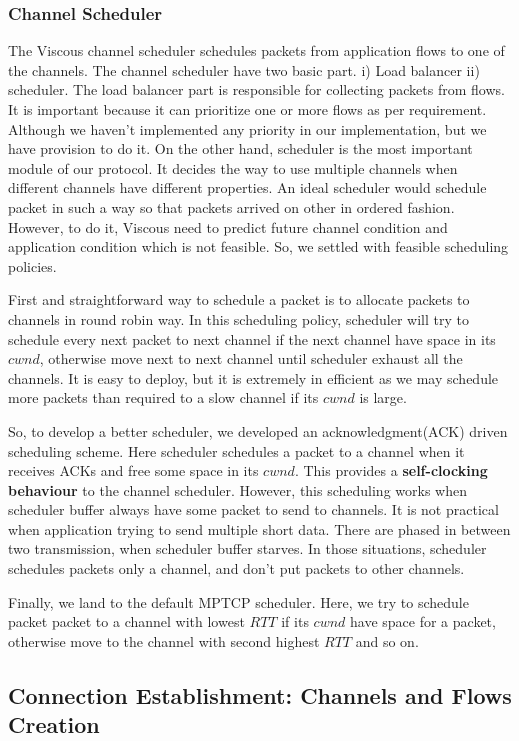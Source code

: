 \subsubsection{Channel Scheduler}
The Viscous channel scheduler schedules packets from application flows to one of the channels. The channel scheduler have two basic part. i) Load balancer ii) scheduler. The load balancer part is responsible for collecting packets from flows. It is important because it can prioritize one or more flows as per requirement. Although we haven't implemented any priority in our implementation, but we have provision to do it. On the other hand, scheduler is the most important module of our protocol. It decides the way to use multiple channels when different channels have different properties. An ideal scheduler would schedule packet in such a way so that packets arrived on other in ordered fashion. However, to do it, Viscous need to predict future channel condition and application condition which is not feasible. So, we settled with feasible scheduling policies.

First and straightforward way to schedule a packet is to allocate packets to channels in round robin way. In this scheduling policy, scheduler will try to schedule every next packet to next channel if the next channel have space in its $cwnd$, otherwise move next to next channel until scheduler exhaust all the channels. It is easy to deploy, but it is extremely in efficient as we may schedule more packets than required to a slow channel if its $cwnd$ is large.

So, to develop a better scheduler, we developed an acknowledgment(ACK) driven scheduling scheme. Here scheduler schedules a packet to a channel when it receives ACKs and free some space in its $cwnd$. This provides a \textbf{self-clocking behaviour} to the channel scheduler. However, this scheduling works when scheduler buffer always have some packet to send to channels. It is not practical when application trying to send multiple short data. There are phased in between two transmission, when scheduler buffer starves. In those situations, scheduler schedules packets only a channel, and don't put packets to other channels.

Finally, we land to the default MPTCP scheduler. Here, we try to schedule packet packet to a channel with lowest $RTT$ if its $cwnd$ have space for a packet, otherwise move to the channel with second highest $RTT$ and so on. 


\subsection{Connection Establishment: Channels and Flows Creation}

